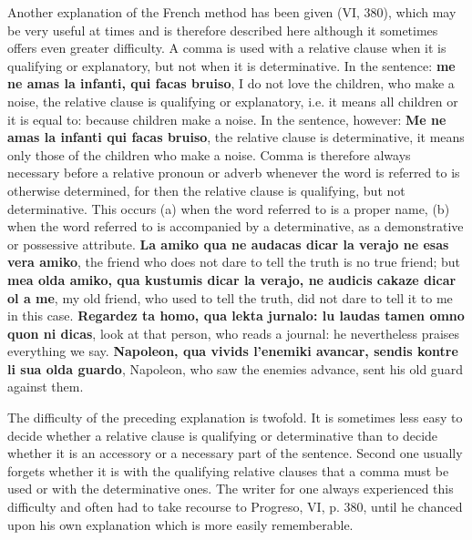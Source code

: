 Another explanation of the French method has been given (VI, 380), which may be very useful at times and is therefore described here although it sometimes offers even greater difficulty. A comma is used with a relative clause when it is qualifying or explanatory, but not when it is determinative. In the sentence: \textbf{me ne amas la infanti, qui facas bruiso}, I do not love the children, who make a noise, the relative clause is qualifying or explanatory, i.e. it means all children or it is equal to: because children make a noise. In the sentence, however: \textbf{Me ne amas la infanti qui facas bruiso}, the relative clause is determinative, it means only those of the children who make a noise. Comma is therefore always necessary before a relative pronoun or adverb whenever the word is referred to is otherwise determined, for then the relative clause is qualifying, but not determinative. This occurs (a) when the word referred to is a proper name, (b) when the word referred to is accompanied by a determinative, as a demonstrative or possessive attribute. \textbf{La amiko qua ne audacas dicar la verajo ne esas vera amiko}, the friend who does not dare to tell the truth is no true friend; but \textbf{mea olda amiko, qua kustumis dicar la verajo, ne audicis cakaze dicar ol a me}, my old friend, who used to tell the truth, did not dare to tell it to me in this case. \textbf{Regardez ta homo, qua lekta jurnalo: lu laudas tamen omno quon ni dicas}, look at that person, who reads a journal: he nevertheless praises everything we say. \textbf{Napoleon, qua vivids l'enemiki avancar, sendis kontre li sua olda guardo}, Napoleon, who saw the enemies advance, sent his old guard against them.

The difficulty of the preceding explanation is twofold. It is sometimes less easy to decide whether a relative clause is qualifying or determinative than to decide whether it is an accessory or a necessary part of the sentence. Second one usually forgets whether it is with the qualifying relative clauses that a comma must be used or with the determinative ones. The writer for one always experienced this difficulty and often had to take recourse to Progreso, VI, p. 380, until he chanced upon his own explanation which is more easily rememberable.

